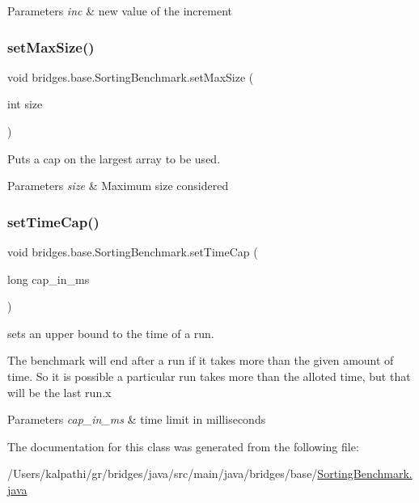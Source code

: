\begin{DoxyParams}{Parameters}
{\em inc} & new value of the increment \\
\hline
\end{DoxyParams}
\mbox{\label{classbridges_1_1base_1_1_sorting_benchmark_a7a390c4820afb92d74ef8f023a6cc227}} 
\subsubsection{\texorpdfstring{setMaxSize()}{setMaxSize()}}
{\footnotesize\ttfamily void bridges.\+base.\+Sorting\+Benchmark.\+set\+Max\+Size (\begin{DoxyParamCaption}\item[{int}]{size }\end{DoxyParamCaption})}



Puts a cap on the largest array to be used. 


\begin{DoxyParams}{Parameters}
{\em size} & Maximum size considered \\
\hline
\end{DoxyParams}
\mbox{\label{classbridges_1_1base_1_1_sorting_benchmark_a52b13910224cfafea16f7f3979a77592}} 
\subsubsection{\texorpdfstring{setTimeCap()}{setTimeCap()}}
{\footnotesize\ttfamily void bridges.\+base.\+Sorting\+Benchmark.\+set\+Time\+Cap (\begin{DoxyParamCaption}\item[{long}]{cap\+\_\+in\+\_\+ms }\end{DoxyParamCaption})}



sets an upper bound to the time of a run. 

The benchmark will end after a run if it takes more than the given amount of time. So it is possible a particular run takes more than the alloted time, but that will be the last run.\+x


\begin{DoxyParams}{Parameters}
{\em cap\+\_\+in\+\_\+ms} & time limit in milliseconds \\
\hline
\end{DoxyParams}


The documentation for this class was generated from the following file\+:\begin{DoxyCompactItemize}
\item 
/\+Users/kalpathi/gr/bridges/java/src/main/java/bridges/base/\mbox{\hyperlink{_sorting_benchmark_8java}{Sorting\+Benchmark.\+java}}\end{DoxyCompactItemize}
